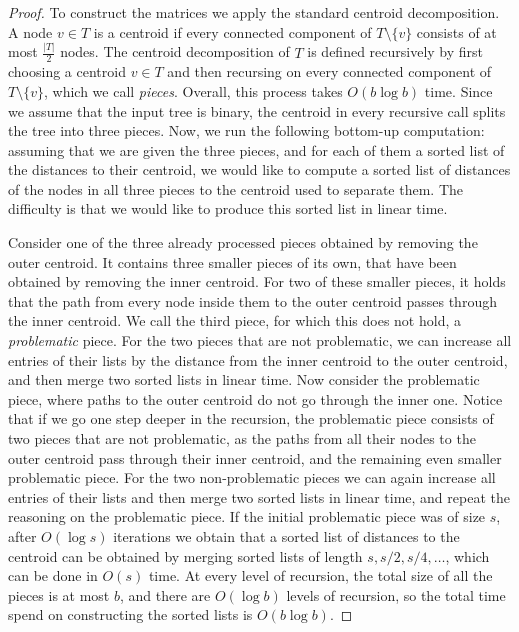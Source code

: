 \documentclass[a4paper,UKenglish]{lipics-v2016}
\theoremstyle{plain}
\begin{document}
\begin{proof}
To construct the matrices we apply the standard centroid decomposition. A node $v\in T$ is a centroid if every connected component of
$T\setminus\{v\}$ consists of at most $\frac{|T|}{2}$ nodes. The centroid decomposition of $T$ is defined recursively by first choosing a centroid
$v\in T$ and then recursing on every connected component of $T\setminus\{v\}$, which we call \emph{pieces}.
Overall, this process takes $O(b\log b)$ time. Since we assume that the input tree is binary, the centroid in every recursive call splits the tree
into three pieces. Now, we run the following bottom-up computation: assuming that we are given the three pieces, and for each of
them a sorted list of the distances to their centroid, we would like to compute a sorted list of distances of the nodes in all three pieces
to the centroid used to separate them. The difficulty is that we would like to produce this sorted list in linear time.

Consider one of the three already processed pieces obtained by removing the outer centroid. It contains three smaller pieces of its own,
that have been obtained by removing the inner centroid.
For two of these smaller pieces, it holds that the path from every node inside them to the outer centroid passes through the inner centroid.
We call the third piece, for which this does not hold, a \textit{problematic} piece. For the two pieces that are not problematic, we can 
increase all entries of their lists by the distance from the inner centroid to the outer centroid, and then merge two sorted lists in linear time.
Now consider the problematic piece, where paths to the outer centroid do not go through the inner one. Notice that if we go one step deeper
in the recursion, the problematic piece consists of two pieces that are not problematic, as the paths from all their nodes to the outer centroid
pass through their inner centroid, and the remaining even smaller problematic piece. For the two non-problematic pieces we can again
increase all entries of their lists and then merge two sorted lists in linear time, and repeat the reasoning on the problematic piece.
If the initial problematic piece was of size $s$, after $O(\log s)$ iterations we obtain that a sorted list of distances to the centroid can be
obtained by merging sorted lists of length $s,s/2,s/4,\ldots$, which can be done in $O(s)$ time. At every level of recursion, 
the total size of all the pieces is at most $b$, and there are $O(\log b)$ levels of recursion, so the total time spend on constructing
the sorted lists is $O(b\log b)$.


\end{proof}
\end{document}
